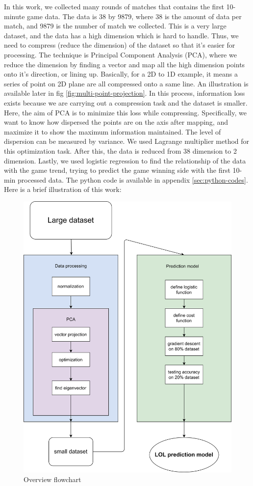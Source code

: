 \documentclass[stu,12pt,floatsintext]{apa7}
\begin{document}
In this work, we collected many rounds of matches that contains the first 10-minute game data. The data is 38 by 9879, where 38 is the amount of data per match, and 9879 is the number of match we collected. This is a very large dataset, and the data has a high dimension which is hard to handle. Thus, we need to compress (reduce the dimension) of the dataset so that it's easier for processing. The technique is Principal Component Analysis (PCA), where we reduce the dimension by finding a vector and map all the high dimension points onto it's direction, or lining up. Basically, for a 2D to 1D example, it means a series of point on 2D plane are all compressed onto a same line. An illustration is available later in fig \ref{fig:multi-point-projection}. In this process, information loss exists because we are carrying out a compression task and the dataset is smaller. Here, the aim of PCA is to minimize this loss while compressing. Specifically, we want to know how dispersed the points are on the axis after mapping, and maximize it to show the maximum information maintained. The level of dispersion can be measured by variance. We used Lagrange multiplier method \parencite{lagrange-multiplier} for this optimization task. After this, the data is reduced from 38 dimension to 2 dimension. Lastly, we used logistic regression to find the relationship of the data with the game trend, trying to predict the game winning side with the first 10-min processed data. The python code is available in appendix \ref{sec:python-codes}. Here is a brief illustration of this work:

\begin{figure}[h]
    \centering
    \includegraphics[width=0.6\linewidth]{images/overview-flowchart.png}
    \caption{Overview flowchart}
    \label{fig:overview-flowchart}
\end{figure}
\end{document}
